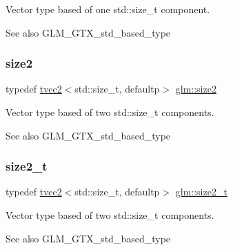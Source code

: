 Vector type based of one std\+::size\+\_\+t component. \begin{DoxySeeAlso}{See also}
G\+L\+M\+\_\+\+G\+T\+X\+\_\+std\+\_\+based\+\_\+type 
\end{DoxySeeAlso}
\mbox{\label{group__gtx__std__based__type_gab8b434ee2ba109726915e977c6aca22a}} 
\subsubsection{\texorpdfstring{size2}{size2}}
{\footnotesize\ttfamily typedef \hyperlink{structglm_1_1tvec2}{tvec2}$<$std\+::size\+\_\+t, defaultp$>$ \hyperlink{group__gtx__std__based__type_gab8b434ee2ba109726915e977c6aca22a}{glm\+::size2}}

Vector type based of two std\+::size\+\_\+t components. \begin{DoxySeeAlso}{See also}
G\+L\+M\+\_\+\+G\+T\+X\+\_\+std\+\_\+based\+\_\+type 
\end{DoxySeeAlso}
\mbox{\label{group__gtx__std__based__type_ga47b1e2bca519b02eb8500a240216b5de}} 
\subsubsection{\texorpdfstring{size2\+\_\+t}{size2\_t}}
{\footnotesize\ttfamily typedef \hyperlink{structglm_1_1tvec2}{tvec2}$<$std\+::size\+\_\+t, defaultp$>$ \hyperlink{group__gtx__std__based__type_ga47b1e2bca519b02eb8500a240216b5de}{glm\+::size2\+\_\+t}}

Vector type based of two std\+::size\+\_\+t components. \begin{DoxySeeAlso}{See also}
G\+L\+M\+\_\+\+G\+T\+X\+\_\+std\+\_\+based\+\_\+type 
\end{DoxySeeAlso}
\mbox{\label{group__gtx__std__based__type_gacf3e47fc09ad812f100e13442919fc79}} 
